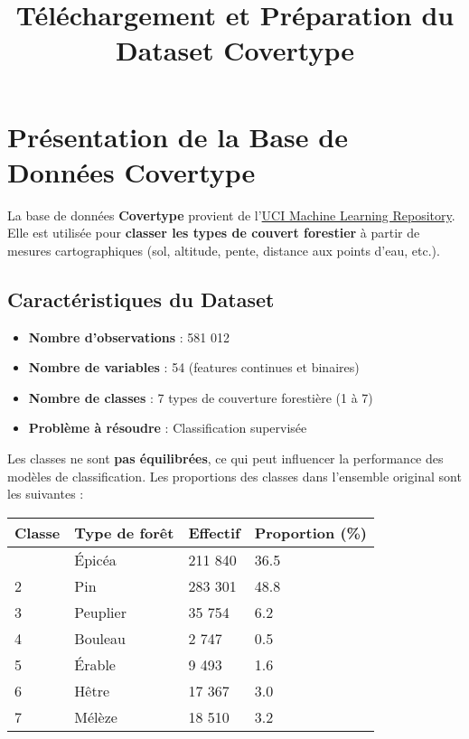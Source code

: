 \documentclass[
  letterpaper,
  DIV=11,
  numbers=noendperiod]{scrartcl}
\title{Téléchargement et Préparation du Dataset Covertype}
\author{}
\date{}
\providecommand{\tightlist}{%
  \setlength{\itemsep}{0pt}\setlength{\parskip}{0pt}}\usepackage{longtable,booktabs,array}
\begin{document}
\maketitle


\section{Présentation de la Base de Données
Covertype}\label{pruxe9sentation-de-la-base-de-donnuxe9es-covertype}

La base de données \textbf{Covertype} provient de
l'\href{https://archive.ics.uci.edu/ml/datasets/Covertype}{UCI Machine
Learning Repository}. Elle est utilisée pour \textbf{classer les types
de couvert forestier} à partir de mesures cartographiques (sol,
altitude, pente, distance aux points d'eau, etc.).

\subsection{Caractéristiques du
Dataset}\label{caractuxe9ristiques-du-dataset}

\begin{itemize}
\tightlist
\item
  \textbf{Nombre d'observations} : 581 012
\item
  \textbf{Nombre de variables} : 54 (features continues et binaires)
\item
  \textbf{Nombre de classes} : 7 types de couverture forestière (1 à 7)
\item
  \textbf{Problème à résoudre} : Classification supervisée
\end{itemize}

Les classes ne sont \textbf{pas équilibrées}, ce qui peut influencer la
performance des modèles de classification. Les proportions des classes
dans l'ensemble original sont les suivantes :

\begin{longtable}[]{@{}llll@{}}
\toprule\noalign{}
Classe & Type de forêt & Effectif & Proportion (\%) \\
\midrule\noalign{}
\endhead
\bottomrule\noalign{}
\endlastfoot
1 & Épicéa & 211 840 & 36.5 \\
2 & Pin & 283 301 & 48.8 \\
3 & Peuplier & 35 754 & 6.2 \\
4 & Bouleau & 2 747 & 0.5 \\
5 & Érable & 9 493 & 1.6 \\
6 & Hêtre & 17 367 & 3.0 \\
7 & Mélèze & 18 510 & 3.2 \\
\end{longtable}
\end{document}
